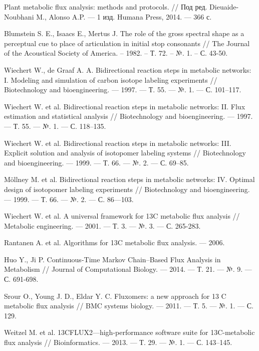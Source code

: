 \documentclass[14pt, a4paper]{extreport}
\begin{document}
\begin{thebibliography}{XXXX}
	Plant metabolic flux analysis: methods and protocols. // Под ред. Dieuaide-Noubhani M., Alonso A.P. --- 1 изд. Humana Press, 2014. --- 366 с.
	
	Blumstein S. E., Isaacs E., Mertus J. The role of the gross spectral shape as a perceptual cue to place of articulation in initial stop consonants // The Journal of the Acoustical Society of America. – 1982. – Т. 72. – №. 1. – С. 43-50.
	
	Wiechert W., de Graaf A. A. Bidirectional reaction steps in metabolic networks: I. Modeling and simulation of carbon isotope labeling experiments // Biotechnology and bioengineering. --- 1997. --- Т. 55. --- №. 1. --- С. 101--117.
	
	Wiechert W. et al. Bidirectional reaction steps in metabolic networks: II. Flux estimation and statistical analysis // Biotechnology and bioengineering. --- 1997. --- Т. 55. --- №. 1. --- С. 118--135.
	
	Wiechert W. et al. Bidirectional reaction steps in metabolic networks: III. Explicit solution and analysis of isotopomer labeling systems // Biotechnology and bioengineering. --- 1999. --- Т. 66. --- №. 2. --- С. 69--85.
	
	Möllney M. et al. Bidirectional reaction steps in metabolic networks: IV. Optimal design of isotopomer labeling experiments // Biotechnology and bioengineering. --- 1999. --- Т. 66. --- №. 2. --- С. 86---103.
	
	Wiechert W. et al. A universal framework for 13C metabolic flux analysis // Metabolic engineering. --- 2001. --- Т. 3. --- №. 3. --- С. 265-283.
	
	Rantanen A. et al. Algorithms for 13C metabolic flux analysis. --- 2006.
	
	Huo Y., Ji P. Continuous-Time Markov Chain–Based Flux Analysis in Metabolism // Journal of Computational Biology. --- 2014. --- Т. 21. --- №. 9. --- С. 691-698.
	
	Srour O., Young J. D., Eldar Y. C. Fluxomers: a new approach for 13 C metabolic flux analysis // BMC systems biology. --- 2011. --- Т. 5. --- №. 1. --- С. 129.
		
	Weitzel M. et al. 13CFLUX2—high-performance software suite for 13C-metabolic flux analysis // Bioinformatics. --- 2013. --- Т. 29. --- №. 1. --- С. 143--145.
	

\end{thebibliography}
\end{document}
